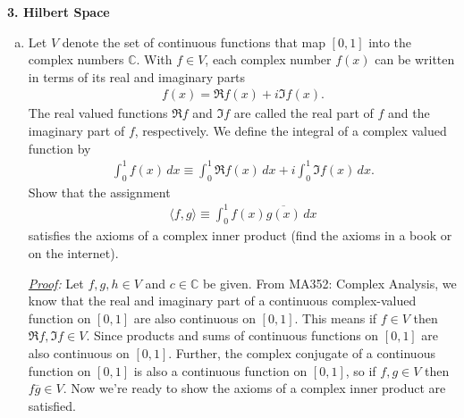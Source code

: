 \documentclass[11pt]{article}
\begin{document}
\newpage









\noindent \textbf{3. Hilbert Space}

\begin{enumerate}[(a)]
	\item Let $V$ denote the set of continuous functions that map $[0,1]$ into the complex numbers $\mathbb{C}$. With $f\in V$, each complex number $f(x)$ can be written in terms of its real and imaginary parts
	\begin{align*}
	f(x) = \Re{f(x)} + i\Im{f(x)}.
	\end{align*}
	The real valued functions $\Re{f}$ and $\Im{f}$ are called the real part of $f$ and the imaginary part of $f$, respectively. We define the integral of a complex valued function by 
	\begin{align*}
	\int^1_0 f(x)\,dx \equiv \int^1_0 \Re{f(x)}\,dx + i\int^1_0\Im{f(x)}\,dx.
	\end{align*}
	Show that the assignment 
	\begin{align*}
	\langle f,g \rangle \equiv \int^1_0 f(x)\overline{g(x)}\,dx
	\end{align*}
	satisfies the axioms of a complex inner product (find the axioms in a book or on the internet).
	
	
	
	
	
	
	
	
	\noindent \textit{\underline{Proof}:} Let $f,g,h\in V$ and $c\in \mathbb{C}$ be given. From MA352: Complex Analysis, we know that the real and imaginary part of a continuous complex-valued function on $[0,1]$ are also continuous on $[0,1]$. This means if $f\in V$ then $\Re{f}, \Im{f} \in V$. Since products and sums of continuous functions on $[0,1]$ are also continuous on $[0,1]$. Further, the complex conjugate of a continuous function on $[0,1]$ is also a continuous function on $[0,1]$, so if $f,g\in V$ then $f\overline{g}\in V$. Now we're ready to show the axioms of a  complex inner product are satisfied. 
	

\end{enumerate}
\end{document}
